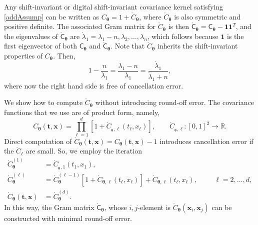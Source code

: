 \documentclass{iitthesis}          %
\newcommand{\bm}[1]{\boldsymbol{#1}}
\newcommand{\reals}{\mathbb{R}}
\newcommand{\rC}{\mathring{C}}
\newcommand{\rlambda}{\mathring{\lambda}}
\newcommand{\vtheta}{{\bm{\theta}}}
\newcommand{\vt}{\bm{t}}
\newcommand{\vx}{\bm{x}}
\newcommand{\vone}{\bm{1}}
\newcommand{\mC}{\mathsf{C}}
\newcommand{\rmC}{\mathring{\mathsf{C}}}
\begin{document}
Any shift-invariant or digital shift-invariant covariance kernel satisfying \eqref{addAssump} can be written as $C_\vtheta = 1 + \rC_\vtheta$, where $\rC_\vtheta$ is also symmetric and positive definite.
The associated Gram matrix for $\rC_\vtheta$ is then $\rmC_\vtheta = \mC_\vtheta - \vone \vone^T$, and the eigenvalues of $\rmC_\vtheta$ are $\rlambda_1 = \lambda_1 - n, \lambda_2, \ldots, \lambda_n$, which follows because $\vone$ is the first eigenvector of both $\mC_\vtheta$ and $\rmC_\vtheta$. Note that $\rC_\vtheta$ inherits the shift-invariant properties of $C_\vtheta$. Then,
\begin{equation*}
1 - \frac{n}{\lambda_1}  = \frac{\lambda_1 - n}{\lambda_1} = \frac{\rlambda_1}{\rlambda_1 +n},
\end{equation*}
where now the right hand side is free of cancellation error.

We show how to compute $\rC_\vtheta$ without introducing round-off error.  The covariance functions that we use are of product form, namely,
\begin{equation*}
C_\vtheta(\vt, \vx) = \prod_{\ell=1}^d \left[1 + \rC_{_\vtheta,\ell}(t_\ell,x_\ell) \right], \qquad  \rC_{_\vtheta,\ell}:[0,1]^2 \to \reals.
\end{equation*}
Direct computation of $\rC_\vtheta (\vt,\vx) = C_\vtheta(\vt,\vx) -1$ introduces cancellation error if the $ \rC_\ell$ are small.  So, we employ the iteration
\begin{align*}
\rC_\vtheta^{(1)} &= \rC_{_\vtheta,1}(t_1,x_1),  \\
\rC_\vtheta^{(\ell)} &  = \rC_\vtheta^{(\ell-1)}[1 + \rC_{\vtheta,\ell}(t_\ell,x_\ell)] + \rC_{\vtheta,\ell}(t_\ell,x_\ell),  \hspace{1cm} \ell = 2, \ldots, d, \\
\rC_\vtheta(\vt,\vx)  & = \rC_\vtheta^{(d)}.
\end{align*}
In this way, the Gram matrix $\rmC_\vtheta$, whose $i,j$-element is $\rC_\vtheta(\vx_i,\vx_j)$ can be constructed with minimal round-off error.
\end{document}
